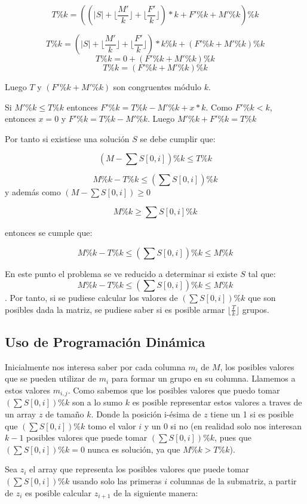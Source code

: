 \documentclass[article]{llncs}
\begin{document}
$$T\%k = ((|S| + \lfloor\frac{M'}{k}\rfloor + \lfloor\frac{F'}{k}\rfloor)*k + F'\%k + M'\% k)\%k$$

$$T\%k = (|S| + \lfloor\frac{M'}{k}\rfloor + \lfloor\frac{F'}{k}\rfloor)*k\%k + (F'\%k + M'\% k)\%k$$
$$T\%k = 0 + (F'\%k + M'\% k)\%k$$
$$T\%k = (F'\%k + M'\% k)\%k$$

Luego $T$ y $(F'\%k + M'\% k)$ son congruentes m\'odulo $k$.

Si $M' \% k \leq T \% k$ entonces $F' \%k = T\%k - M'\%k + x*k$.
Como $F' \% k < k$, entonces $x = 0$ y $F' \% k = T\%k - M'\%k$. Luego 
$M' \%k + F' \% k  = T \% k$

Por tanto si existiese una solución $S$ se debe cumplir que:

$$(M - \sum S[0, i])\% k \leq T\%k$$

$$M \%k - T\%k \leq (\sum S[0,i])\%k$$ 
y además como $(M - \sum S[0,i]) \geq 0$

$$M\%k \geq \sum S[0, i] \%k$$

entonces se cumple que: 

$$M\%k - T\% k \leq (\sum S[0,i])\%k \leq M \% k$$

En este punto el problema se ve reducido a determinar si existe $S$ tal que: $$M\%k - T\% k \leq (\sum S[0,i])\%k \leq M \% k$$.
Por tanto, si se pudiese calcular los valores de $(\sum S[0,i])\%k$ que son posibles dada la matriz, se pudiese saber si es posible armar $\lfloor\frac{T}{k}\rfloor$
grupos.

\subsection{Uso de Programación Dinámica}

Inicialmente nos interesa saber por cada columna $m_i$ de $M$, los posibles valores que se pueden utilizar de $m_i$ para formar un grupo en su columna. Llamemos a estos valores $m_{i,j}$.
Como sabemos que los posibles valores que puedo tomar $(\sum S[0,i])\%k$ son a lo sumo $k$ es posible representar estos valores a traves de un array $z$ de tamaño $k$. Donde la posición i-ésima de $z$ tiene
un 1 si es posible que $(\sum S[0,i])\%k$ tomo el valor $i$ y un 0 si no (en realidad solo nos interesan $k-1$ posibles valores que puede tomar $(\sum S[0,i])\%k$, pues que $(\sum S[0,i])\%k = 0$ nunca es solución, ya que $M\%k > T\%k$).

Sea $z_i$ el array que representa los posibles valores que puede tomar $(\sum S[0,i])\%k$ usando solo las primeras $i$ columnas de la submatriz,
a partir de $z_i$ es posible calcular $z_{i+1}$ de la siguiente manera:
\end{document}
